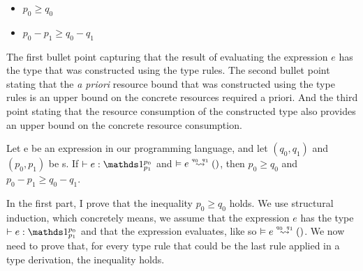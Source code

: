 \begin{itemize}
   \item \(p_0 \geq q_0\)     
   \item \(p_0 - p_1 \geq q_0 - q_1\)
\end{itemize}

The first bullet point capturing that the result of evaluating the expression \(e\) has the type that was constructed using the type rules. The second bullet point stating that the \emph{a priori} resource bound that was constructed using the type rules is an upper bound on the concrete resources required a priori. And the third point stating that the resource consumption of the constructed type also provides an upper bound on the concrete resource consumption.

\begin{theorem}
   Let e be an expression in our programming language, and let \((q_0, q_1)\) and \((p_0, p_1)\) be s. If \(\typing{}{e}{\ratype{\unit}{p_0}{p_1}}\) and \(\evals{}{e}{()}{q_0}{q_1}\), then \(p_0 \geq q_0\) and \(p_0 - p_1 \geq q_0 - q_1\).
\end{theorem}

In the first part, I prove that the inequality \(p_0 \geq q_0\) holds. We use structural induction, which concretely means, we assume that the expression \(e\) has the type \(\typing{}{e}{\ratype{\unit}{p_0}{p_1}}\) and that the expression evaluates, like so \(\evals{}{e}{()}{q_0}{q_1}\). We now need to prove that, for every type rule that could be the last rule applied in a type derivation, the inequality holds.

